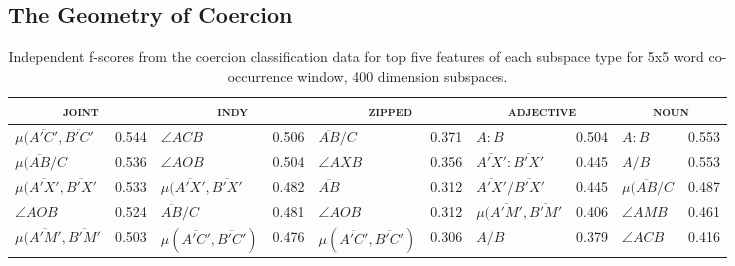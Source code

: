\subsection{The Geometry of Coercion}
\begin{table}
\centering
\tiny
\begin{tabular}{lr|lr|lr|lr|lr}
\hline
\multicolumn{2}{c}{\textsc{joint}} & \multicolumn{2}{c}{\textsc{indy}} & \multicolumn{2}{c}{\textsc{zipped}} & \multicolumn{2}{c}{\textsc{adjective}} & \multicolumn{2}{c}{\textsc{noun}} \\
\hline
$\mu(\overline{A'C'},\overline{B'C'}$ & 0.544 & $\angle ACB$ & 0.506 & $\overline{AB}/C$ & 0.371 & $A:B$ & 0.504 & $A:B$ & 0.553 \\
$\mu(\overline{AB}/C$ & 0.536 & $\angle AOB$ & 0.504 & $\angle AXB$ & 0.356 & $\overline{A'X'}:\overline{B'X'}$ & 0.445 & $A/B$ & 0.553 \\
$\mu(\overline{A'X'},\overline{B'X'}$ & 0.533 & $\mu(\overline{A'X'},\overline{B'X'}$ & 0.482 & $\overline{AB}$ & 0.312 & $\overline{A'X'}/\overline{B'X'}$ & 0.445 & $\mu(\overline{AB}/C$ & 0.487 \\
$\angle AOB$ & 0.524 & $\overline{AB}/C$ & 0.481 & $\angle AOB$ & 0.312 & $\mu(\overline{A'M'},\overline{B'M'}$ & 0.406 & $\angle AMB$ & 0.461 \\
$\mu(\overline{A'M'},\overline{B'M'}$ & 0.503 & $\mu(\overline{A'C'},\overline{B'C'})$ & 0.476 & $\mu(\overline{A'C'},\overline{B'C'})$ & 0.306 & $A/B$ & 0.379 & $\angle ACB$ & 0.416 \\
\hline
\end{tabular}
\caption[Top Independent Features for Coercion Classification]{Independent f-scores from the coercion classification data for top five features of each subspace type for 5x5 word co-occurrence window, 400 dimension subspaces.}
\label{tab:ind-metaphor}
\end{table}

